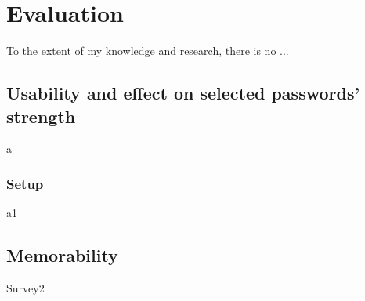 
\chapter{Evaluation}
\label{cha:evaluation}
To the extent of my knowledge and research, there is no ...


\section{Usability and effect on selected passwords' strength}
  a

  \subsection{Setup}
      a1


\section{Memorability}
    Survey2